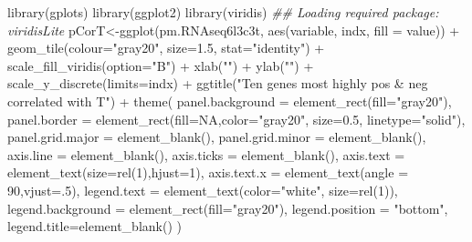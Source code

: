 \documentclass[]{article}
\newcommand{\hlnum}[1]{\textcolor[rgb]{0.816,0.125,0.439}{#1}}%
\newcommand{\hlstr}[1]{\textcolor[rgb]{0.251,0.627,0.251}{#1}}%
\newcommand{\hlcom}[1]{\textcolor[rgb]{0.502,0.502,0.502}{\textit{#1}}}%
\newcommand{\hlopt}[1]{\textcolor[rgb]{0,0,0}{#1}}%
\newcommand{\hlstd}[1]{\textcolor[rgb]{0.251,0.251,0.251}{#1}}%
\newcommand{\hlkwc}[1]{\textcolor[rgb]{0.251,0.251,0.251}{#1}}%
\newcommand{\hlkwd}[1]{\textcolor[rgb]{0.878,0.439,0.125}{#1}}%
\newenvironment{Shaded}{\begin{myshaded}}{\end{myshaded}}
\newcommand{\KeywordTok}[1]{\hlkwd{#1}}
\newcommand{\DataTypeTok}[1]{\hlkwc{#1}}
\newcommand{\DecValTok}[1]{\hlnum{#1}}
\newcommand{\FloatTok}[1]{\hlnum{#1}}
\newcommand{\StringTok}[1]{\hlstr{#1}}
\newcommand{\CommentTok}[1]{\hlcom{#1}}
\newcommand{\OtherTok}[1]{{#1}}
\newcommand{\OperatorTok}[1]{\hlopt{#1}}
\newcommand{\NormalTok}[1]{\hlstd{#1}}
\begin{document}
\begin{Shaded}
\begin{Highlighting}[]
\KeywordTok{library}\NormalTok{(gplots)}
\KeywordTok{library}\NormalTok{(ggplot2)}
\KeywordTok{library}\NormalTok{(viridis)}
\CommentTok{## Loading required package: viridisLite}
\NormalTok{pCorT<-}\KeywordTok{ggplot}\NormalTok{(pm.RNAseq6l3c3t, }\KeywordTok{aes}\NormalTok{(variable, indx, }\DataTypeTok{fill =}\NormalTok{ value)) }\OperatorTok{+}
\StringTok{  }\KeywordTok{geom_tile}\NormalTok{(}\DataTypeTok{colour=}\StringTok{"gray20"}\NormalTok{, }\DataTypeTok{size=}\FloatTok{1.5}\NormalTok{, }\DataTypeTok{stat=}\StringTok{"identity"}\NormalTok{) }\OperatorTok{+}
\StringTok{  }\KeywordTok{scale_fill_viridis}\NormalTok{(}\DataTypeTok{option=}\StringTok{"B"}\NormalTok{) }\OperatorTok{+}
\StringTok{  }\KeywordTok{xlab}\NormalTok{(}\StringTok{""}\NormalTok{) }\OperatorTok{+}\StringTok{  }\KeywordTok{ylab}\NormalTok{(}\StringTok{""}\NormalTok{) }\OperatorTok{+}
\StringTok{  }\KeywordTok{scale_y_discrete}\NormalTok{(}\DataTypeTok{limits=}\NormalTok{indx) }\OperatorTok{+}
\StringTok{  }\KeywordTok{ggtitle}\NormalTok{(}\StringTok{"Ten genes most highly pos & neg correlated with T"}\NormalTok{) }\OperatorTok{+}
\StringTok{  }\KeywordTok{theme}\NormalTok{(}
    \DataTypeTok{panel.background =} \KeywordTok{element_rect}\NormalTok{(}\DataTypeTok{fill=}\StringTok{"gray20"}\NormalTok{),}
    \DataTypeTok{panel.border =} \KeywordTok{element_rect}\NormalTok{(}\DataTypeTok{fill=}\OtherTok{NA}\NormalTok{,}\DataTypeTok{color=}\StringTok{"gray20"}\NormalTok{, }\DataTypeTok{size=}\FloatTok{0.5}\NormalTok{, }\DataTypeTok{linetype=}\StringTok{"solid"}\NormalTok{),}
    \DataTypeTok{panel.grid.major =} \KeywordTok{element_blank}\NormalTok{(),}
    \DataTypeTok{panel.grid.minor =} \KeywordTok{element_blank}\NormalTok{(),}
    \DataTypeTok{axis.line =} \KeywordTok{element_blank}\NormalTok{(),}
    \DataTypeTok{axis.ticks =} \KeywordTok{element_blank}\NormalTok{(),}
    \DataTypeTok{axis.text =} \KeywordTok{element_text}\NormalTok{(}\DataTypeTok{size=}\KeywordTok{rel}\NormalTok{(}\DecValTok{1}\NormalTok{),}\DataTypeTok{hjust=}\DecValTok{1}\NormalTok{),}
    \DataTypeTok{axis.text.x =} \KeywordTok{element_text}\NormalTok{(}\DataTypeTok{angle =} \DecValTok{90}\NormalTok{,}\DataTypeTok{vjust=}\NormalTok{.}\DecValTok{5}\NormalTok{),}
    \DataTypeTok{legend.text =} \KeywordTok{element_text}\NormalTok{(}\DataTypeTok{color=}\StringTok{"white"}\NormalTok{, }\DataTypeTok{size=}\KeywordTok{rel}\NormalTok{(}\DecValTok{1}\NormalTok{)),}
    \DataTypeTok{legend.background =} \KeywordTok{element_rect}\NormalTok{(}\DataTypeTok{fill=}\StringTok{"gray20"}\NormalTok{),}
    \DataTypeTok{legend.position =} \StringTok{"bottom"}\NormalTok{,}
    \DataTypeTok{legend.title=}\KeywordTok{element_blank}\NormalTok{()}
\NormalTok{)}
\end{Highlighting}
\end{Shaded}
\end{document}
